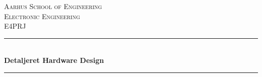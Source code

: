 \newcommand{\HRule}{\rule{\linewidth}{0.5mm}} %

\begin{center} %
 

\textsc{\LARGE Aarhus School of Engineering}\\[1.5cm] %
\textsc{\Large Electronic Engineering}\\[0.5cm] %
\textsc{\large E4PRJ}\\[0.5cm] %


\HRule \\[0.4cm]
{ \huge \bfseries Detaljeret Hardware Design}\\[0.4cm] %
\HRule \\[1.5cm]
 


\end{center}
